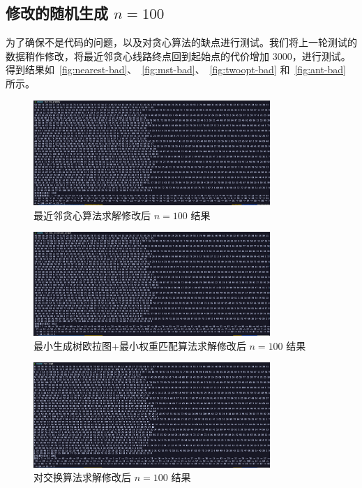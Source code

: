 \subsection{修改的随机生成 $n=100$}
为了确保不是代码的问题，以及对贪心算法的缺点进行测试。我们将上一轮测试的数据稍作修改，将最近邻贪心线路终点回到起始点的代价增加 3000，进行测试。得到结果如~\autoref{fig:nearest-bad}、~\autoref{fig:mst-bad}、~\autoref{fig:twoopt-bad} 和~\autoref{fig:ant-bad} 所示。
\begin{figure}[htbp]
    \centering
    \includegraphics[width=0.8\textwidth]{images/greedy_bad.png}
    \caption{最近邻贪心算法求解修改后 $n=100$ 结果}
    \label{fig:nearest-bad}
\end{figure}
\begin{figure}[htbp]
    \centering
    \includegraphics[width=0.8\textwidth]{images/mst_bad.png}
    \caption{最小生成树欧拉图+最小权重匹配算法求解修改后 $n=100$ 结果}
    \label{fig:mst-bad}
\end{figure}
\begin{figure}[htbp]
    \centering
    \includegraphics[width=0.8\textwidth]{images/2opt_bad.png}
    \caption{对交换算法求解修改后 $n=100$ 结果}
    \label{fig:twoopt-bad}
\end{figure}

